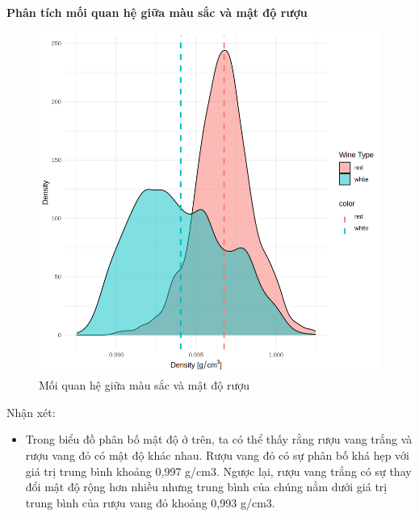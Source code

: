 \textbf{Phân tích mối quan hệ giữa màu sắc và mật độ rượu}
\begin{figure}[H]
    \centering
    \includegraphics[width=0.75\columnwidth]{wine_colors/wine_color_density.png}
    \caption{Mối quan hệ giữa màu sắc và mật độ rượu}
    \label{fig:wine_color_density}
\end{figure}
Nhận xét:
\begin{itemize}
    \item Trong biểu đồ phân bố mật độ ở trên, ta có thể thấy rằng rượu vang trắng và rượu vang đỏ có mật độ khác nhau. Rượu vang đỏ có sự phân bố khá hẹp với giá trị trung bình khoảng 0,997 g/cm3. Ngược lại, rượu vang trắng có sự thay đổi mật độ rộng hơn nhiều nhưng trung bình của chúng nằm dưới giá trị trung bình của rượu vang đỏ khoảng 0,993 g/cm3.
\end{itemize}

